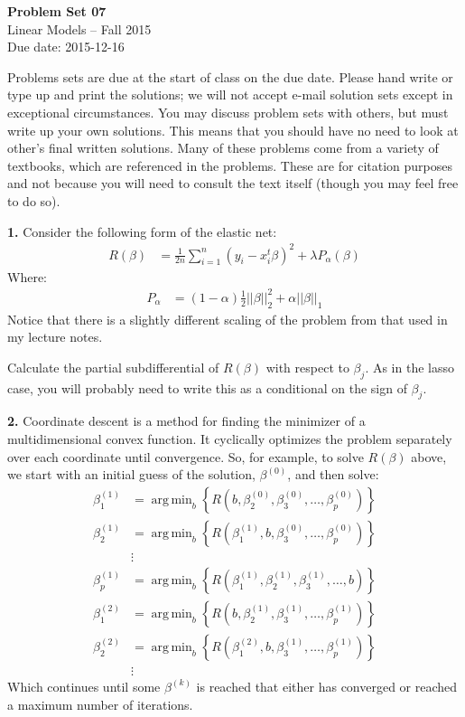 \documentclass[12pt]{article}
\newcommand{\argmin}{\mathop{\mathrm{arg\,min}}}
\begin{document}
\begin{center}
{\bf Problem Set 07} \\
Linear Models -- Fall 2015 \\
Due date: 2015-12-16
\end{center}

\medskip

Problems sets are due at the start of class on the due date. Please hand write
or type up and print the solutions; we will not accept e-mail solution sets except
in exceptional circumstances. You may discuss problem sets with others, but must
write up your own solutions. This means that you should have no need to look at other's
final written solutions. Many of these problems come from a variety of textbooks,
which are referenced in the problems. These are for citation purposes and not because
you will need to consult the text itself (though you may feel free to do so).

\medskip

\textbf{1.} Consider the following form of the elastic net:
\begin{align*}
R(\beta) &= \frac{1}{2n} \sum_{i=1}^n ( y_i - x^t_i \beta)^2 + \lambda P_\alpha (\beta)
\end{align*}
Where:
\begin{align*}
P_\alpha &= (1 - \alpha) \frac{1}{2} || \beta ||_2^2 + \alpha || \beta ||_1
\end{align*}
Notice that there is a slightly different scaling of the problem from that used in my lecture
notes.

Calculate the partial subdifferential of $R(\beta)$ with respect to $\beta_j$. As in the
lasso case, you will probably need to write this as a conditional on the sign of $\beta_j$.

\textbf{2.} Coordinate descent is a method for finding the minimizer of a multidimensional
convex function. It cyclically optimizes the problem separately over each coordinate until
convergence. So, for example, to solve $R(\beta)$ above, we start with an initial guess of
the solution, $\beta^{(0)}$, and then solve:
\begin{align*}
\beta^{(1)}_1 &= \argmin_b \left\{R(b, \beta^{(0)}_2, \beta^{(0)}_3, \ldots, \beta^{(0)}_p) \right\} \\
\beta^{(1)}_2 &= \argmin_b \left\{R(\beta^{(1)}_1, b, \beta^{(0)}_3, \ldots, \beta^{(0)}_p) \right\} \\
&\vdots \\
\beta^{(1)}_p &= \argmin_b \left\{R(\beta^{(1)}_1, \beta^{(1)}_2, \beta^{(1)}_3, \ldots, b) \right\} \\
\beta^{(2)}_1 &= \argmin_b \left\{R(b, \beta^{(1)}_2, \beta^{(1)}_3, \ldots, \beta^{(1)}_p) \right\} \\
\beta^{(2)}_2 &= \argmin_b \left\{R(\beta^{(2)}_1, b, \beta^{(1)}_3, \ldots, \beta^{(1)}_p) \right\} \\
&\vdots
\end{align*}
Which continues until some $\beta^{(k)}$ is reached that either has converged or reached a maximum
number of iterations.
\end{document}
